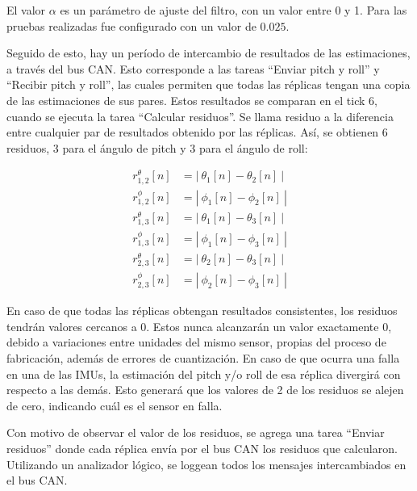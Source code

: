 El valor $\alpha$ es un parámetro de ajuste del filtro, con un valor entre 0 y 1. Para las pruebas realizadas fue configurado con un valor de $0.025$.

Seguido de esto, hay un período de intercambio de resultados de las estimaciones, a través del bus CAN. Esto corresponde a las tareas ``Enviar pitch y roll'' y ``Recibir pitch y roll'', las cuales permiten que todas las réplicas tengan una copia de las estimaciones de sus pares. Estos resultados se comparan en el tick 6, cuando se ejecuta la tarea ``Calcular residuos''. Se llama residuo a la diferencia entre cualquier par de resultados obtenido por las réplicas. Así, se obtienen 6 residuos, 3 para el ángulo de pitch y 3 para el ángulo de roll:

\begin{subequations}
    \begin{align}
        r_{1,2}^\theta[n] &= \left| \ \theta_1[n] - \theta_2[n] \ \right|\\
        r_{1,2}^\phi[n]   &= \left| \ \phi_1[n]   - \phi_2[n]   \ \right|\\
        r_{1,3}^\theta[n] &= \left| \ \theta_1[n] - \theta_3[n] \ \right|\\
        r_{1,3}^\phi[n]   &= \left| \ \phi_1[n]   - \phi_3[n]   \ \right|\\
        r_{2,3}^\theta[n] &= \left| \ \theta_2[n] - \theta_3[n] \ \right|\\
        r_{2,3}^\phi[n]   &= \left| \ \phi_2[n]   - \phi_3[n]   \ \right|
    \end{align}
\end{subequations}

En caso de que todas las réplicas obtengan resultados consistentes, los residuos tendrán valores cercanos a 0. Estos nunca alcanzarán un valor exactamente 0, debido a variaciones entre unidades del mismo sensor, propias del proceso de fabricación, además de errores de cuantización. En caso de que ocurra una falla en una de las IMUs, la estimación del pitch y/o roll de esa réplica divergirá con respecto a las demás. Esto generará que los valores de 2 de los residuos se alejen de cero, indicando cuál es el sensor en falla.

Con motivo de observar el valor de los residuos, se agrega una tarea ``Enviar residuos'' donde cada réplica envía por el bus CAN los residuos que calcularon. Utilizando un analizador lógico, se loggean todos los mensajes intercambiados en el bus CAN.

